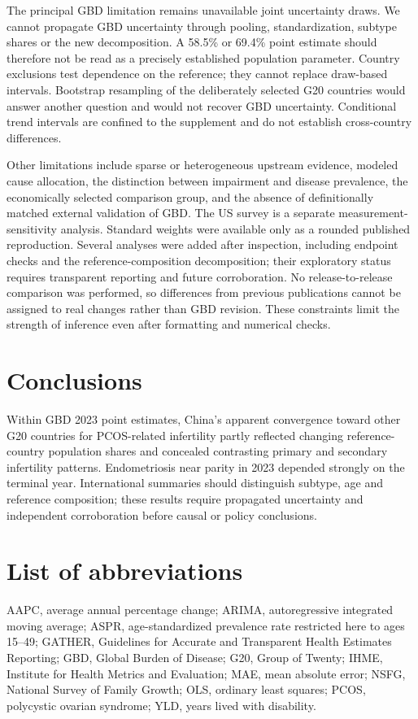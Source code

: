 \documentclass[11pt,a4paper]{article}
\begin{document}


The principal GBD limitation remains unavailable joint uncertainty draws. We cannot propagate GBD uncertainty through pooling, standardization, subtype shares or the new decomposition. A 58.5\% or 69.4\% point estimate should therefore not be read as a precisely established population parameter. Country exclusions test dependence on the reference; they cannot replace draw-based intervals. Bootstrap resampling of the deliberately selected G20 countries would answer another question and would not recover GBD uncertainty. Conditional trend intervals are confined to the supplement and do not establish cross-country differences.

Other limitations include sparse or heterogeneous upstream evidence, modeled cause allocation, the distinction between impairment and disease prevalence, the economically selected comparison group, and the absence of definitionally matched external validation of GBD. The US survey is a separate measurement-sensitivity analysis. Standard weights were available only as a rounded published reproduction. Several analyses were added after inspection, including endpoint checks and the reference-composition decomposition; their exploratory status requires transparent reporting and future corroboration. No release-to-release comparison was performed, so differences from previous publications cannot be assigned to real changes rather than GBD revision. These constraints limit the strength of inference even after formatting and numerical checks.

\section{Conclusions}
Within GBD 2023 point estimates, China's apparent convergence toward other G20 countries for PCOS-related infertility partly reflected changing reference-country population shares and concealed contrasting primary and secondary infertility patterns. Endometriosis near parity in 2023 depended strongly on the terminal year. International summaries should distinguish subtype, age and reference composition; these results require propagated uncertainty and independent corroboration before causal or policy conclusions.

\section*{List of abbreviations}
AAPC, average annual percentage change; ARIMA, autoregressive integrated moving average; ASPR, age-standardized prevalence rate restricted here to ages 15--49; GATHER, Guidelines for Accurate and Transparent Health Estimates Reporting; GBD, Global Burden of Disease; G20, Group of Twenty; IHME, Institute for Health Metrics and Evaluation; MAE, mean absolute error; NSFG, National Survey of Family Growth; OLS, ordinary least squares; PCOS, polycystic ovarian syndrome; YLD, years lived with disability.
\end{document}
